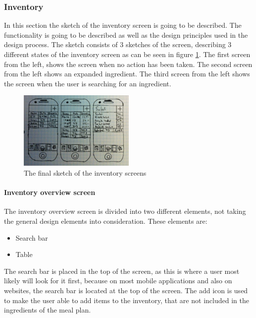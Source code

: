 \subsubsection{Inventory} \label{InventoryScreen}

In this section the sketch of the inventory screen is going to be described. The functionality is going to be described as well as the design principles used in the design process. The sketch consists of 3 sketches of the screen, describing 3 different states of the inventory screen as can be seen in figure \ref{FinalInventorySketch}. The first screen from the left, shows the screen when no action has been taken. The second screen from the left shows an expanded ingredient. The third screen from the left shows the screen when the user is searching for an ingredient.

\begin{figure}[H]
    \centering
    \includegraphics[width=0.5\textwidth]{Grafik/FoodPlanner/FinalInventorySketch}
    \caption{The final sketch of the inventory screens}
    \label{FinalInventorySketch}
\end{figure}

\paragraph{Inventory overview screen}

The inventory overview screen is divided into two different elements, not taking the general design elements into consideration. These elements are:

\begin{itemize}
    \item Search bar
    \item Table
\end{itemize}

The search bar is placed in the top of the screen, as this is where a user most likely will look for it first, because on most mobile applications and also on websites, the search bar is located at the
top of the screen. The add icon is used to make the user able to add items to the inventory, that are not included in the ingredients of the meal plan.

